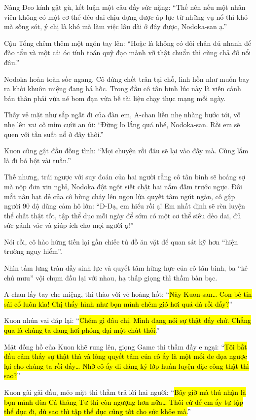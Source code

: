 \documentclass[../main.tex]{subfiles}
\begin{document}
Nàng Đeo kính gật gù, kết luận một câu đầy sức nặng: ``Thế nên nếu một nhân viên không có một cơ thể dẻo dai chịu đựng được áp lực từ những vụ nổ thì khó mà sống sót, ý chị là khó mà làm việc lâu dài ở đây được, Nodoka-san ạ.''

Cậu Tổng chêm thêm một ngón tay lên: ``Hoặc là không có đôi chân đủ nhanh để đào tẩu và một cái óc tính toán quỹ đạo mảnh vỡ thật chuẩn thì cũng chả đỡ nổi đâu.''

Nodoka hoàn toàn sốc ngang. Cô đứng chết trân tại chỗ, linh hồn như muốn bay ra khỏi khuôn miệng đang há hốc. Trong đầu cô tân binh lúc này là viễn cảnh bản thân phải vừa né bom đạn vừa bế tài liệu chạy thục mạng mỗi ngày.

Thấy vẻ mặt như sắp ngất đi của đàn em, A-chan liền nhẹ nhàng bước tới, vỗ nhẹ lên vai cô mỉm cười an ủi: ``Đừng lo lắng quá nhé, Nodoka-san. Rồi em sẽ quen với tần suất nổ ở đây thôi.''

Kuon cũng gật đầu đồng tình: ``Mọi chuyện rồi đâu sẽ lại vào đấy mà. Cùng lắm là đi bó bột vài tuần.''

Thế nhưng, trái ngược với suy đoán của hai người rằng cô tân binh sẽ hoảng sợ mà nộp đơn xin nghỉ, Nodoka đột ngột siết chặt hai nắm đấm trước ngực. Đôi mắt nâu hạt dẻ của cô bùng cháy lên ngọn lửa quyết tâm ngút ngàn, cô gập người 90 độ dũng cảm hô lớn: ``D-Dạ, em hiểu rồi ạ! Em nhất định sẽ rèn luyện thể chất thật tốt, tập thể dục mỗi ngày để sớm có một cơ thể siêu dẻo dai, đủ sức gánh vác và giúp ích cho mọi người ạ!''

Nói rồi, cô hào hứng tiến lại gần chiếc tủ đồ ăn vặt để quan sát kỹ hơn ``hiện trường nguy hiểm''.

Nhìn tấm lưng tràn đầy sinh lực và quyết tâm hừng hực của cô tân binh, ba ``kẻ chủ mưu'' vội chụm đầu lại với nhau, hạ thấp giọng thì thầm bàn bạc.

A-chan lấy tay che miệng, thì thào với vẻ hoảng hốt: ``\hl{Này Kuon-san\dots{} Con bé tin sái cổ luôn kìa! Chị thấy hình như bọn mình chém gió hơi quá đà rồi đấy?}''

Kuon nhún vai đáp lại: ``\hl{Chém gì đâu chị. Mình đang nói sự thật đấy chứ. Chẳng qua là chúng ta đang hơi phóng đại một chút thôi.}''

Mặt đồng hồ của Kuon khẽ rung lên, giọng Game thì thầm đầy e ngại: ``\hl{Tôi bắt đầu cảm thấy sự thật thà và lòng quyết tâm của cô ấy là một mối đe dọa ngược lại cho chúng ta rồi đấy\dots{} Nhỡ cô ấy đi đăng ký lớp huấn luyện đặc công thật thì sao?}''

Kuon gãi gãi đầu, méo mặt thì thầm trả lời hai người: ``\hl{Bây giờ mà thú nhận là bọn mình đùa Cá tháng Tư thì còn ngượng hơn nữa\dots{} Thôi cứ để em ấy tự tập thể dục đi, dù sao thì tập thể dục cũng tốt cho sức khỏe mà.}''
\end{document}

